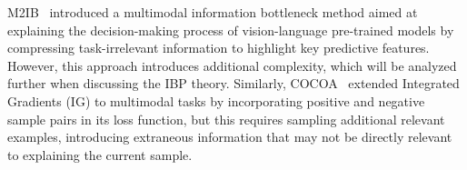 \begin{table}[htpb]
\centering
\caption{Comparison of interpretability methods based on several criteria: whether they require no extra examples, no randomness, need no specific structure, avoid information loss, explain the current model, and don't rely on downstream tasks.}
\label{tab.comp}
\end{table}


M2IB~\citep{wang2023visual} introduced a multimodal information bottleneck method aimed at explaining the decision-making process of vision-language pre-trained models by compressing task-irrelevant information to highlight key predictive features. However, this approach introduces additional complexity, which will be analyzed further when discussing the IBP theory. Similarly, COCOA~\citep{lin2022contrastive} extended Integrated Gradients (IG) to multimodal tasks by incorporating positive and negative sample pairs in its loss function, but this requires sampling additional relevant examples, introducing extraneous information that may not be directly relevant to explaining the current sample.

